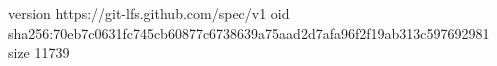 version https://git-lfs.github.com/spec/v1
oid sha256:70eb7c0631fc745cb60877c6738639a75aad2d7afa96f2f19ab313c597692981
size 11739
